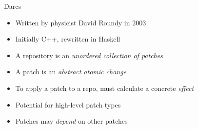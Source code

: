 \documentclass[pdf]{prosper}
\begin{document}
\begin{slide}{Darcs}
\begin{itemize}
\item Written by physicist David Roundy in 2003
\item Initially C++, rewritten in Haskell
\item A repository is an \emph{unordered collection of patches}
\item A patch is an \emph{abstract atomic change}
\item To apply a patch to a repo, must calculate a concrete \emph{effect}
\item Potential for high-level patch types
\item Patches may \emph{depend} on other patches
\end{itemize}
\end{slide}




\end{document}
